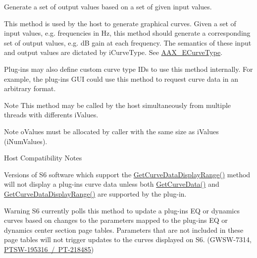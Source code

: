 Generate a set of output values based on a set of given input values. 

This method is used by the host to generate graphical curves. Given a set of input values, e.\+g. frequencies in Hz, this method should generate a corresponding set of output values, e.\+g. dB gain at each frequency. The semantics of these input and output values are dictated by {\ttfamily i\+Curve\+Type}. See \mbox{\hyperlink{a00812_ga59c73d8f51c5c55d54a728eff39da884}{A\+A\+X\+\_\+\+E\+Curve\+Type}}.

Plug-\/ins may also define custom curve type I\+Ds to use this method internally. For example, the plug-\/in\textquotesingle{}s G\+UI could use this method to request curve data in an arbitrary format.


\begin{DoxyItemize}
\item \begin{DoxyNote}{Note}
This method may be called by the host simultaneously from multiple threads with differents {\ttfamily i\+Values}.
\end{DoxyNote}

\item \begin{DoxyNote}{Note}
{\ttfamily o\+Values} must be allocated by caller with the same size as {\ttfamily i\+Values} ({\ttfamily i\+Num\+Values}).
\end{DoxyNote}
\begin{DoxyRefDesc}{Host Compatibility Notes}
\item[\mbox{\hyperlink{a00786__compatibility_notes000053}{Host Compatibility Notes}}]Versions of S6 software which support the \mbox{\hyperlink{a00812_ga38d1ac0c15a7052904077ef0e2527e0d}{Get\+Curve\+Data\+Display\+Range()}} method will not display a plug-\/in\textquotesingle{}s curve data unless both \mbox{\hyperlink{a00812_gaa85bda4027342eb644a9c92a17da6d49}{Get\+Curve\+Data()}} and \mbox{\hyperlink{a00812_ga38d1ac0c15a7052904077ef0e2527e0d}{Get\+Curve\+Data\+Display\+Range()}} are supported by the plug-\/in.\end{DoxyRefDesc}

\end{DoxyItemize}

\begin{DoxyWarning}{Warning}
S6 currently polls this method to update a plug-\/in\textquotesingle{}s EQ or dynamics curves based on changes to the parameters mapped to the plug-\/in\textquotesingle{}s EQ or dynamics center section page tables. Parameters that are not included in these page tables will not trigger updates to the curves displayed on S6. (G\+W\+S\+W-\/7314, \mbox{\hyperlink{a00846_PTSW-195316}{P\+T\+S\+W-\/195316 / P\+T-\/218485}})
\end{DoxyWarning}

